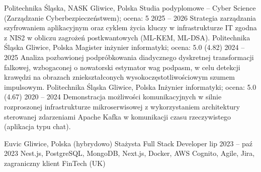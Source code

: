 \newcommand{\EducationTitle}{Edukacja}
\newcommand{\ThesisLabel}{Praca dyplomowa}
\renewcommand{\EducationList}{}
\AddEducationEntry
  {Politechnika Śląska, NASK}
  {Gliwice, Polska}
  {Studia podyplomowe -- Cyber Science (Zarządzanie Cyberbezpieczeństwem); ocena: 5}
  {2025 -- 2026}
  {%
    Strategia zarządzania szyfrowaniem aplikacyjnym oraz cyklem życia kluczy w infrastrukturze IT zgodna z NIS2 w
    obliczu zagrożeń postkwantowych (ML-KEM, ML-DSA).
  }
\AddEducationEntry
  {Politechnika Śląska}
  {Gliwice, Polska}
  {Magister inżynier informatyki; ocena: 5.0 (4.82)}
  {2024 -- 2025}
  {%
    Analiza pozbawionej podpróbkowania diadycznego dyskretnej transformacji falkowej, wzbogaconej o nowatorski estymator
    wag podpasm, w celu detekcji krawędzi na obrazach zniekształconych wysokoczęstotliwościowym szumem impulsowym.
  }
\AddEducationEntry
  {Politechnika Śląska}
  {Gliwice, Polska}
  {Inżynier informatyki; ocena: 5.0 (4.67)}
  {2020 -- 2024}
  {%
    Demonstracja możliwości komunikacyjnych w silnie rozproszonej infrastrukturze mikroserwisowej z wykorzystaniem
    architektury sterowanej zdarzeniami Apache Kafka w komunikacji czasu rzeczywistego (aplikacja typu chat).
  }


\newcommand{\ExperienceTitle}{Doświadczenie zawodowe}
\newcommand{\WorkHybrid}{hybrydowo}
\renewcommand{\ExperienceList}{}
\AddExperienceEntry
  {Euvic}
  {Gliwice, Polska (\WorkHybrid)}
  {Stażysta Full Stack Developer}
  {lip 2023 -- paź 2023}
  {Nest.js, PostgreSQL, MongoDB, Next.js, Docker, AWS Cognito, Agile, Jira, zagraniczny klient FinTech (UK)}


\newcommand{\LabelEmail}{E-mail:}
\newcommand{\LabelPortfolio}{Portfolio:}
\newcommand{\LabelMobile}{Telefon:}
\newcommand{\LabelGitHub}{GitHub:}
\newcommand{\LabelLinkedIn}{LinkedIn:}
\newcommand{\PortfolioUrlSuffix}{/pl}
\newcommand{\SummaryText}{%
  Magister inżynier informatyki z podyplomowym wykształceniem w obszarze cyberbezpieczeństwa specjalizujący się w
  projektowaniu rozproszonych systemów transmisji czasu rzeczywistego (Java, C, IoT) oraz zaawansowanym przetwarzaniu
  multimediów (DSP, algorytmy falkowe, kryptografia, steganografia).
}


\newcommand{\TitleHobby}{Zainteresowania}
\newcommand{\TextHobby}{%
  Entuzjasta systemów automatyki domowej i systemów automatyki multimedialnej. Archeolog internetowy, miłośnik kina
  niezależnego i alternatywnych brzmień. Prywatnie aktywny archiwista nośników analogowych i stały czytelnik literatury
  sci-fi, kosmologicznej, popularnonaukowej oraz opowiadań Lovecrafta.
}

